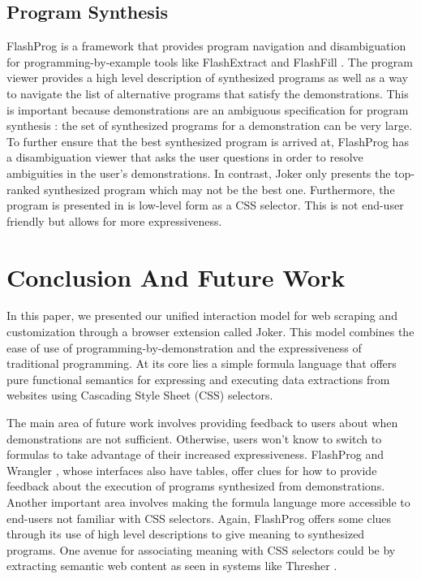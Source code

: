 \documentclass[sigconf,10pt]{acmart}
\begin{document}
\hypertarget{program-synthesis}{%
\subsection{Program Synthesis}\label{program-synthesis}}

FlashProg \citep{mayer2015} is a framework that provides program
navigation and disambiguation for programming-by-example tools like
FlashExtract \citep{le2014} and FlashFill \citep{harris}. The program
viewer provides a high level description of synthesized programs as well
as a way to navigate the list of alternative programs that satisfy the
demonstrations. This is important because demonstrations are an
ambiguous specification for program synthesis \citep{peleg2018}: the set
of synthesized programs for a demonstration can be very large. To
further ensure that the best synthesized program is arrived at,
FlashProg has a disambiguation viewer that asks the user questions in
order to resolve ambiguities in the user's demonstrations. In contrast,
Joker only presents the top-ranked synthesized program which may not be
the best one. Furthermore, the program is presented in is low-level form
as a CSS selector. This is not end-user friendly but allows for more
expressiveness.

\hypertarget{sec:conclusion}{%
\section{Conclusion And Future Work}\label{sec:conclusion}}

In this paper, we presented our unified interaction model for web
scraping and customization through a browser extension called Joker.
This model combines the ease of use of programming-by-demonstration and
the expressiveness of traditional programming. At its core lies a simple
formula language that offers pure functional semantics for expressing
and executing data extractions from websites using Cascading Style Sheet
(CSS) selectors.

The main area of future work involves providing feedback to users about
when demonstrations are not sufficient. Otherwise, users won't know to
switch to formulas to take advantage of their increased expressiveness.
FlashProg \citep{mayer2015} and Wrangler \citep{kandel2011}, whose
interfaces also have tables, offer clues for how to provide feedback
about the execution of programs synthesized from demonstrations. Another
important area involves making the formula language more accessible to
end-users not familiar with CSS selectors. Again, FlashProg offers some
clues through its use of high level descriptions to give meaning to
synthesized programs. One avenue for associating meaning with CSS
selectors could be by extracting semantic web content as seen in systems
like Thresher \citep{hogue2005}.




\end{document}
